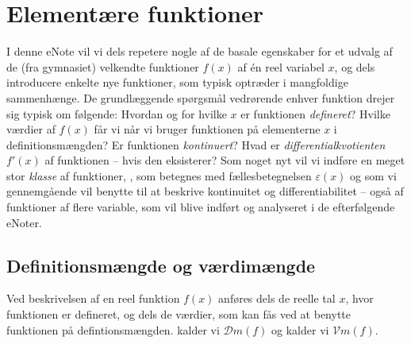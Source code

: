 
\setcounter{chapter}{13} %





\chapter{Elementære funktioner} \label{tn14}


\begin{basis}
I denne eNote vil vi dels repetere nogle af de basale egenskaber for et udvalg af de (fra gymnasiet) velkendte funktioner $f(x)$ af \'{e}n reel variabel $x$,  og dels introducere enkelte nye funktioner,
som typisk optræder i mangfoldige sammenhænge. De grundlæggende spørgsmål vedrørende enhver funktion drejer sig typisk om følgende: Hvordan og for hvilke $x$ er funktionen \emph{defineret}? Hvilke værdier af $f(x)$ får vi når vi bruger funktionen på elementerne $x$ i definitionsmængden? Er funktionen \emph{kontinuert}? Hvad er \emph{differentialkvotienten} $f'(x)$ af funktionen -- hvis den eksisterer? Som noget nyt vil vi indføre en meget stor \emph{klasse} af funktioner, , som betegnes med fællesbetegnelsen $\varepsilon(x)$ og som vi gennemgående vil benytte til at beskrive kontinuitet og differentiabilitet -- også af funktioner af flere variable, som vil blive indført og analyseret i de efterfølgende eNoter.
\end{basis}





\section{Definitionsmængde og værdimængde} \label{tn14.secDefVal}
Ved beskrivelsen af en reel funktion $f(x)$ anføres dels de reelle tal $x$, hvor funktionen er defineret, og dels de
værdier, som kan fås ved at benytte funktionen på defintionsmængden.  kalder vi $\mathcal{D}m(f)$ og  kalder vi $\mathcal{V}m(f)$.

